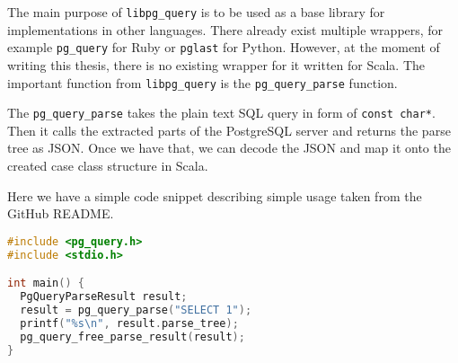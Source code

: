 The main purpose of \texttt{libpg\_query} is to be used as a base library for implementations in other languages. There already exist multiple wrappers, for example \texttt{pg\_query} for Ruby or \texttt{pglast} for Python. However, at the moment of writing this thesis, there is no existing wrapper for it written for Scala. The important function from \texttt{libpg\_query} is the \texttt{pg\_query\_parse} function.

The \texttt{pg\_query\_parse} takes the plain text SQL query in form of \texttt{const char*}. Then it calls the extracted parts of the PostgreSQL server and returns the parse tree as JSON. Once we have that, we can decode the JSON and map it onto the created case class structure in Scala.

\newpage
Here we have a simple code snippet describing simple usage taken from the GitHub README\cite{libpgquery}. 

\begin{lstlisting}[language=C, basicstyle=\ttfamily, keywordstyle=\color{purple}]
#include <pg_query.h>
#include <stdio.h>

int main() {
  PgQueryParseResult result;
  result = pg_query_parse("SELECT 1");
  printf("%s\n", result.parse_tree);
  pg_query_free_parse_result(result);
}
\end{lstlisting}